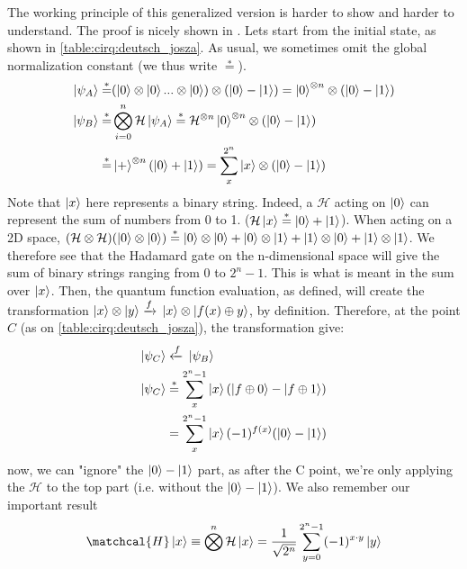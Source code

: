 The working principle of this generalized version is harder to show and harder to understand. The proof is nicely shown in \cite{noauthor_deutschjozsa_2022}.
Lets start from the initial state, as shown in \autoref{table:cirq:deutsch_josza}. As usual, we sometimes omit the global normalization constant 
(we thus write $\stackrel{*}{=}$).
\begin{align}
  \ket{\psi_A}\stackrel{*}{=}& (\ket{0}\otimes \ket{0} ... \otimes \ket{0})\otimes (\ket{0}-\ket{1}) = \ket{0}^{\otimes n}\otimes (\ket{0}-\ket{1})\\
  \ket{\psi_B}\stackrel{*}{=}& \bigotimes_{i=0}^{n} \mathcal{H} \ket{\psi_A} \stackrel{*}{=} \mathcal{H}^{\otimes n}\ket{0}^{\otimes n}\otimes (\ket{0}-\ket{1})\\
  \stackrel{*}{=}& \ket{+}^{\otimes n} (\ket{0}+\ket{1}) = \sum_{x}^{2^n} \ket{x}\otimes (\ket{0}-\ket{1})
\end{align}
Note that $\ket{x}$ here represents a binary string. Indeed, a $\mathcal{H}$ acting on $\ket{0}$ can represent the sum of numbers from 0 to 1. 
($\mathcal{H}\ket{x}\stackrel{*}{=}\ket{0}+\ket{1}$). When acting on a 2D space, 
$(\mathcal{H}\otimes \mathcal{H})(\ket{0}\otimes \ket{0})\stackrel{*}{=}\ket{0}\otimes \ket{0} + \ket{0}\otimes \ket{1} + \ket{1}\otimes \ket{0} + \ket{1}\otimes \ket{1}$.
We therefore see that the Hadamard gate on the n-dimensional space will give the sum of binary strings ranging from $0$ to $2^n-1$. This is what is meant 
in the sum over $\ket{x}$.
Then, the quantum function evaluation, as defined, will create the transformation $\ket{x}\otimes \ket{y} \xrightarrow{f}{} \ket{x}\otimes \ket{f(x)\oplus y}$,
by definition.
Therefore, at the point $C$ (as on \autoref{table:cirq:deutsch_josza}), the transformation give:
\begin{align}
  \ket{\psi_C} &\xleftarrow{f}{} \ket{\psi_B} \\
  \ket{\psi_C} &\stackrel{*}{=} \sum_x^{2^n-1} \ket{x}(\ket{f\oplus 0}-\ket{f \oplus 1}) \\
               &= \sum_x^{2^n-1} \ket{x}(-1)^{f(x)} (\ket{0}-\ket{1})
\label{eq:deutsch_josza_C}
\end{align}
now, we can "ignore" the $\ket{0}-\ket{1}$ part, as after the C point, we're only applying the $\mathcal{H}$ to the top part (i.e. without the 
$\ket{0}-\ket{1}$). We also remember our important result 
\begin{align}
  \matchcal{H} \ket{x} \equiv \bigotimes^n \mathcal{H} \ket{x} = \frac{1}{\sqrt{2^n}} \sum_{y=0}^{2^n-1} (-1)^{x\cdot y}\ket{y}
  \label{eq:hadamard_on_generic}
\end{align}
